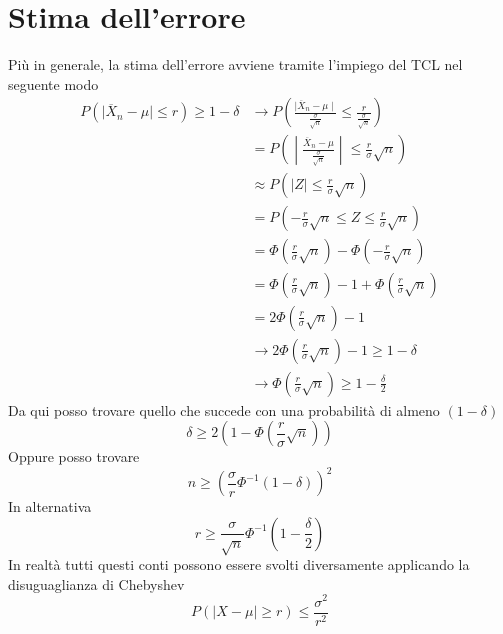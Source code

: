 \documentclass[11pt]{report}
\begin{document}
\section{Stima dell'errore}
Più in generale, la stima dell'errore avviene tramite l'impiego del TCL nel seguente modo
\begin{equation}
    \begin{split}
        P \left( \mid \overline{X}_n - \mu \mid \leq r \right) \geq 1 - \delta & \rightarrow P \left( \frac{\mid \overline{X}_n - \mu \mid}{\frac{\sigma}{\sqrt{n}}} \leq \frac{r}{\frac{\sigma}{\sqrt{n}}} \right)\\
        & = P \left( \middle| \frac{\overline{X}_n - \mu}{\frac{\sigma}{\sqrt{n}}} \middle| \leq \frac{r}{\sigma}\sqrt{n} \right)\\
        & \approx P \left( \mid Z \mid \leq \frac{r}{\sigma}\sqrt{n} \right)\\
        & = P \left( -\frac{r}{\sigma} \sqrt{n} \leq Z \leq \frac{r}{\sigma}\sqrt{n} \right)\\
        & = \Phi \left( \frac{r}{\sigma}\sqrt{n} \right) - \Phi \left( -\frac{r}{\sigma}\sqrt{n} \right)\\
        & = \Phi \left( \frac{r}{\sigma}\sqrt{n} \right) - 1 + \Phi \left( \frac{r}{\sigma}\sqrt{n} \right)\\
        & = 2 \Phi \left( \frac{r}{\sigma}\sqrt{n} \right) - 1\\
        & \rightarrow 2 \Phi \left( \frac{r}{\sigma}\sqrt{n} \right) - 1 \geq 1 - \delta\\
        & \rightarrow \Phi \left( \frac{r}{\sigma}\sqrt{n} \right) \geq 1 - \frac{\delta}{2}
    \end{split}
\end{equation}
Da qui posso trovare quello che succede con una probabilità di almeno $(1-\delta)$
\begin{equation}
	\delta \geq 2 \left( 1 - \Phi \left( \frac{r}{\sigma}\sqrt{n} \right) \right)
\end{equation}
Oppure posso trovare
\begin{equation}
	n \geq \left( \frac{\sigma}{r} \Phi^{-1}(1-\delta) \right)^2
\end{equation}
In alternativa
\begin{equation}
	r \geq \frac{\sigma}{\sqrt{n}} \Phi^{-1} \left(1 - \frac{\delta}{2} \right)
\end{equation}
In realtà tutti questi conti possono essere svolti diversamente applicando la disuguaglianza di Chebyshev
\begin{equation}
	P \left( \mid X - \mu \mid \geq r \right) \leq \frac{\sigma^2}{r^2}
\end{equation}
\end{document}
